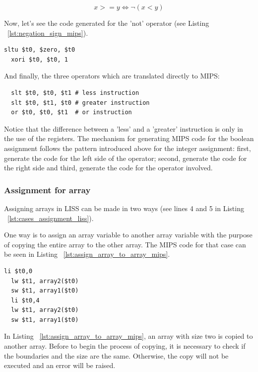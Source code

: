 \documentclass[
  oneside,
  11pt, a4paper,
  footinclude=true,
  headinclude=true,
  cleardoublepage=empty
]{scrbook}
\begin{document}
\begin{equation}
  x >= y \iff \lnot ( x < y )
\end{equation}

Now, let's see the code generated for the 'not' operator (see Listing ~\ref{lst:negation_sign_mips}).

\begin{lstlisting}[caption={Code generated for 'not' operator in MIPS},label={lst:negation_sign_mips}]
  sltu $t0, $zero, $t0	
  xori $t0, $t0, 1	
\end{lstlisting}

And finally, the three operators which are translated directly to MIPS:

\begin{lstlisting}
  slt $t0, $t0, $t1	# less instruction
  slt $t0, $t1, $t0	# greater instruction
  or $t0, $t0, $t1	# or instruction
\end{lstlisting}

Notice that the difference between a 'less' and a 'greater' instruction is only in the use of the registers. The mechanism for generating MIPS code for the boolean assignment follows the pattern introduced above for the integer assignment: first, generate the code for the left side of the operator; second, generate the code for the right side and third, generate the code for the operator involved.

\subsubsection{Assignment for array}

Assigning arrays in LISS can be made in two ways (see lines 4 and 5 in Listing ~\ref{lst:cases_assignment_liss}).

One way is to assign an array variable to another array variable with the purpose of copying the entire array to the other array. The MIPS code for that case can be seen in Listing ~\ref{lst:assign_array_to_array_mips}.

\begin{lstlisting}[caption={Code generated for line 4 in Listing ~\ref{lst:cases_assignment_liss}},label={lst:assign_array_to_array_mips}]
  li $t0,0		
  lw $t1, array2($t0)		
  sw $t1, array1($t0)		
  li $t0,4		
  lw $t1, array2($t0)		
  sw $t1, array1($t0)		
\end{lstlisting}

In Listing ~\ref{lst:assign_array_to_array_mips}, an array with size two is copied to another array. Before to begin the process of copying, it is necessary to check if the boundaries and the size are the same. Otherwise, the copy will not be executed and an error will be raised. 
\end{document}

